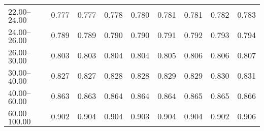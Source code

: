 \begin{table}[htp]
\begin{tiny}
\begin{center}
\begin{tabular}{|l|c|c|c|c|c|c|c|c|}
$22.00$--$24.00$ & 0.777 & 0.777 & 0.778 & 0.780 & 0.781 & 0.781 & 0.782 & 0.783  \\
$24.00$--$26.00$ & 0.789 & 0.789 & 0.790 & 0.790 & 0.791 & 0.792 & 0.793 & 0.794  \\
$26.00$--$30.00$ & 0.803 & 0.803 & 0.804 & 0.804 & 0.805 & 0.806 & 0.806 & 0.807  \\
$30.00$--$40.00$ & 0.827 & 0.827 & 0.828 & 0.828 & 0.829 & 0.829 & 0.830 & 0.831  \\
$40.00$--$60.00$ & 0.863 & 0.863 & 0.864 & 0.864 & 0.864 & 0.865 & 0.865 & 0.866  \\
$60.00$--$100.00$ & 0.902 & 0.904 & 0.904 & 0.903 & 0.904 & 0.904 & 0.902 & 0.906  \\
\hline
\end{tabular} 
             \end{center} 
             \end{tiny} 
             \label{tab:sa_long_jpsi} 
             \end{table}


